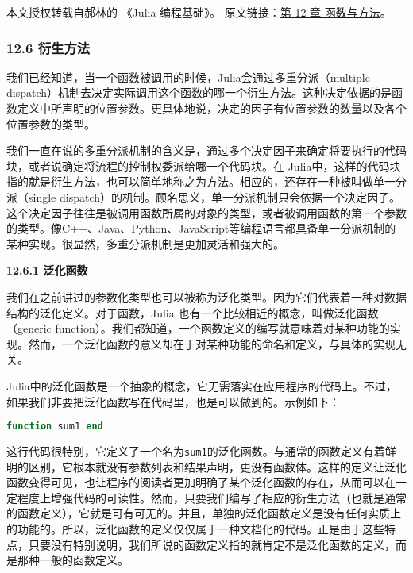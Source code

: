 
本文授权转载自郝林的 《Julia 编程基础》。 原文链接：\href{https://github.com/hyper0x/JuliaBasics/blob/master/book/ch12.md}{第 12 章 函数与方法}。


\subsubsection{12.6 衍生方法}

我们已经知道，当一个函数被调用的时候，Julia会通过多重分派（multiple dispatch）机制去决定实际调用这个函数的哪一个衍生方法。这种决定依据的是函数定义中所声明的位置参数。更具体地说，决定的因子有位置参数的数量以及各个位置参数的类型。

我们一直在说的多重分派机制的含义是，通过多个决定因子来确定将要执行的代码块，或者说确定将流程的控制权委派给哪一个代码块。在 Julia中，这样的代码块指的就是衍生方法，也可以简单地称之为方法。相应的，还存在一种被叫做单一分派（single dispatch）的机制。顾名思义，单一分派机制只会依据一个决定因子。这个决定因子往往是被调用函数所属的对象的类型，或者被调用函数的第一个参数的类型。像C++、Java、Python、JavaScript等编程语言都具备单一分派机制的某种实现。很显然，多重分派机制是更加灵活和强大的。

\textbf{12.6.1 泛化函数}

我们在之前讲过的参数化类型也可以被称为泛化类型。因为它们代表着一种对数据结构的泛化定义。对于函数，Julia 也有一个比较相近的概念，叫做泛化函数（generic function）。我们都知道，一个函数定义的编写就意味着对某种功能的实现。然而，一个泛化函数的意义却在于对某种功能的命名和定义，与具体的实现无关。

Julia中的泛化函数是一个抽象的概念，它无需落实在应用程序的代码上。不过，如果我们非要把泛化函数写在代码里，也是可以做到的。示例如下：

\begin{lstlisting}[language=julia]
function sum1 end
\end{lstlisting}

这行代码很特别，它定义了一个名为\verb`sum1`的泛化函数。与通常的函数定义有着鲜明的区别，它根本就没有参数列表和结果声明，更没有函数体。这样的定义让泛化函数变得可见，也让程序的阅读者更加明确了某个泛化函数的存在，从而可以在一定程度上增强代码的可读性。然而，只要我们编写了相应的衍生方法（也就是通常的函数定义），它就是可有可无的。并且，单独的泛化函数定义是没有任何实质上的功能的。所以，泛化函数的定义仅仅属于一种文档化的代码。正是由于这些特点，只要没有特别说明，我们所说的函数定义指的就肯定不是泛化函数的定义，而是那种一般的函数定义。

